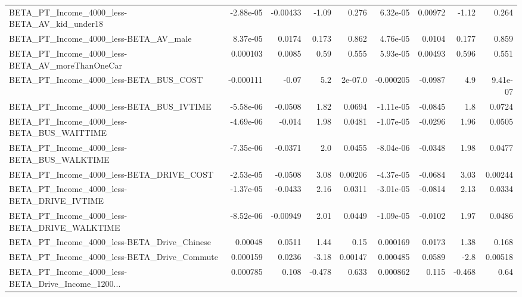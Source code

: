 \begin{tabular}{lrrrrrrrr}
BETA\_PT\_Income\_4000\_less-BETA\_AV\_kid\_under18       &   -2.88e-05 &     -0.00433 &    -1.09 &    0.276 &   6.32e-05 &     0.00972 &        -1.12 &         0.264 \\
BETA\_PT\_Income\_4000\_less-BETA\_AV\_male              &    8.37e-05 &       0.0174 &    0.173 &    0.862 &   4.76e-05 &      0.0104 &        0.177 &         0.859 \\
BETA\_PT\_Income\_4000\_less-BETA\_AV\_moreThanOneCar    &    0.000103 &       0.0085 &     0.59 &    0.555 &   5.93e-05 &     0.00493 &        0.596 &         0.551 \\
BETA\_PT\_Income\_4000\_less-BETA\_BUS\_COST             &   -0.000111 &        -0.07 &      5.2 &  2e-07.0 &  -0.000205 &     -0.0987 &          4.9 &      9.41e-07 \\
BETA\_PT\_Income\_4000\_less-BETA\_BUS\_IVTIME           &   -5.58e-06 &      -0.0508 &     1.82 &   0.0694 &  -1.11e-05 &     -0.0845 &          1.8 &        0.0724 \\
BETA\_PT\_Income\_4000\_less-BETA\_BUS\_WAITTIME         &   -4.69e-06 &       -0.014 &     1.98 &   0.0481 &  -1.07e-05 &     -0.0296 &         1.96 &        0.0505 \\
BETA\_PT\_Income\_4000\_less-BETA\_BUS\_WALKTIME         &   -7.35e-06 &      -0.0371 &      2.0 &   0.0455 &  -8.04e-06 &     -0.0348 &         1.98 &        0.0477 \\
BETA\_PT\_Income\_4000\_less-BETA\_DRIVE\_COST           &   -2.53e-05 &      -0.0508 &     3.08 &  0.00206 &  -4.37e-05 &     -0.0684 &         3.03 &       0.00244 \\
BETA\_PT\_Income\_4000\_less-BETA\_DRIVE\_IVTIME         &   -1.37e-05 &      -0.0433 &     2.16 &   0.0311 &  -3.01e-05 &     -0.0814 &         2.13 &        0.0334 \\
BETA\_PT\_Income\_4000\_less-BETA\_DRIVE\_WALKTIME       &   -8.52e-06 &     -0.00949 &     2.01 &   0.0449 &  -1.09e-05 &     -0.0102 &         1.97 &        0.0486 \\
BETA\_PT\_Income\_4000\_less-BETA\_Drive\_Chinese        &     0.00048 &       0.0511 &     1.44 &     0.15 &   0.000169 &      0.0173 &         1.38 &         0.168 \\
BETA\_PT\_Income\_4000\_less-BETA\_Drive\_Commute        &    0.000159 &       0.0236 &    -3.18 &  0.00147 &   0.000485 &      0.0589 &         -2.8 &       0.00518 \\
BETA\_PT\_Income\_4000\_less-BETA\_Drive\_Income\_1200... &    0.000785 &        0.108 &   -0.478 &    0.633 &   0.000862 &       0.115 &       -0.468 &          0.64 \\

\end{tabular}
